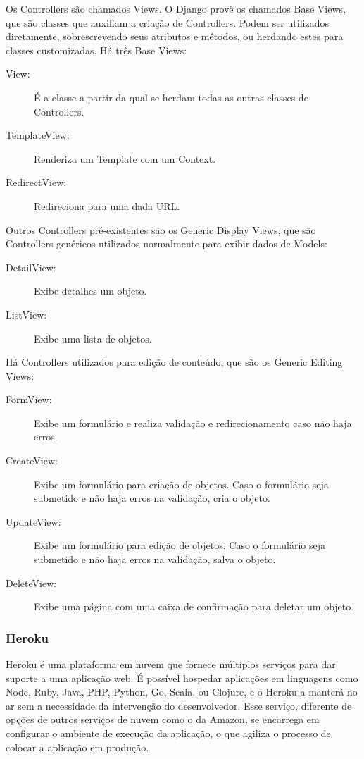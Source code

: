 Os Controllers são chamados Views. O Django provê os chamados Base Views, que são classes que auxiliam a criação de Controllers. Podem ser utilizados diretamente, sobrescrevendo seus atributos e métodos, ou herdando estes para classes customizadas. Há três Base Views: 
\begin{description}
	\item[View:] É a classe a partir da qual se herdam todas as outras classes de Controllers.
	\item[TemplateView:] Renderiza um Template com um Context.
	\item[RedirectView:] Redireciona para uma dada URL.
\end{description} 

Outros Controllers pré-existentes são os Generic Display Views, que são Controllers genéricos utilizados normalmente para exibir dados de Models:
\begin{description}
	\item[DetailView:] Exibe detalhes um objeto.
	\item[ListView:] Exibe uma lista de objetos.
\end{description}

Há Controllers utilizados para edição de conteúdo, que são os Generic Editing Views:
\begin{description}
	\item[FormView:] Exibe um formulário e realiza validação e redirecionamento caso não haja erros.
	\item[CreateView:] Exibe um formulário para criação de objetos. Caso o formulário seja submetido e não haja erros na validação, cria o objeto.
	\item[UpdateView:] Exibe um formulário para edição de objetos. Caso o formulário seja submetido e não haja erros na validação, salva o objeto.
	\item[DeleteView:] Exibe uma página com uma caixa de confirmação para deletar um objeto.
\end{description}

\subsubsection{Heroku}

Heroku é uma plataforma em nuvem que fornece múltiplos serviços para dar suporte a uma aplicação web. É possível hospedar aplicações em linguagens como Node, Ruby, Java, PHP, Python, Go, Scala, ou Clojure, e o Heroku a manterá no ar sem a necessidade da intervenção do desenvolvedor. Esse serviço, diferente de opções de outros serviços de nuvem como o da Amazon, se encarrega em configurar o ambiente de execução da aplicação, o que agiliza o processo de colocar a aplicação em produção.

